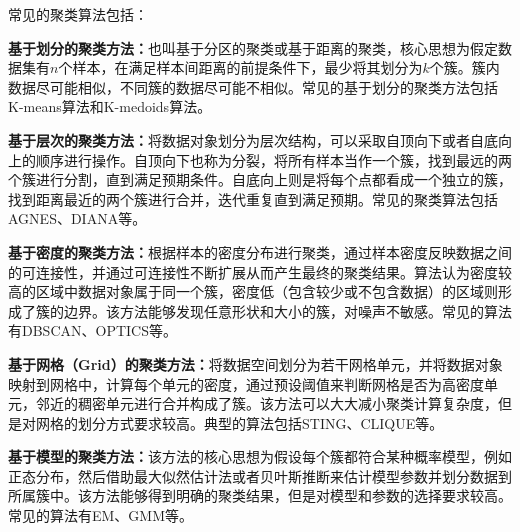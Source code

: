 常见的聚类算法包括：
\begin{compactitem}
	\item
	\textbf{基于划分的聚类方法：}也叫基于分区的聚类或基于距离的聚类，核心思想为假定数据集有$ n $个样本，在满足样本间距离的前提条件下，最少将其划分为$ k $个簇。簇内数据尽可能相似，不同簇的数据尽可能不相似。常见的基于划分的聚类方法包括K-means算法和K-medoids算法。
	\item
	\textbf{基于层次的聚类方法：}将数据对象划分为层次结构，可以采取自顶向下或者自底向上的顺序进行操作。自顶向下也称为分裂，将所有样本当作一个簇，找到最远的两个簇进行分割，直到满足预期条件。自底向上则是将每个点都看成一个独立的簇，找到距离最近的两个簇进行合并，迭代重复直到满足预期。常见的聚类算法包括AGNES、DIANA等。
	\item
	\textbf{基于密度的聚类方法：}根据样本的密度分布进行聚类，通过样本密度反映数据之间的可连接性，并通过可连接性不断扩展从而产生最终的聚类结果。算法认为密度较高的区域中数据对象属于同一个簇，密度低（包含较少或不包含数据）的区域则形成了簇的边界。该方法能够发现任意形状和大小的簇，对噪声不敏感。常见的算法有DBSCAN、OPTICS等。
	\item
	\textbf{基于网格（Grid）的聚类方法：}将数据空间划分为若干网格单元，并将数据对象映射到网格中，计算每个单元的密度，通过预设阈值来判断网格是否为高密度单元，邻近的稠密单元进行合并构成了簇。该方法可以大大减小聚类计算复杂度，但是对网格的划分方式要求较高。典型的算法包括STING、CLIQUE等。
	\item
	\textbf{基于模型的聚类方法：}该方法的核心思想为假设每个簇都符合某种概率模型，例如正态分布，然后借助最大似然估计法或者贝叶斯推断来估计模型参数并划分数据到所属簇中。该方法能够得到明确的聚类结果，但是对模型和参数的选择要求较高。常见的算法有EM、GMM等。
\end{compactitem}

